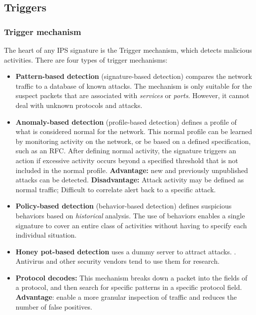 \subsection{Triggers}

\subsubsection{Trigger mechanism}

The heart of any IPS signature is the Trigger mechanism, which detects malicious activities. There are four types of trigger mechanisms:

\begin{itemize}
\item \textbf{Pattern-based detection} (signature-based detection) compares the network traffic to a database of known attacks. The mechanism is only suitable for the suspect packets that are associated with \emph{services} or \emph{ports}. However, it cannot deal with unknown protocols and attacks.

\item \textbf{Anomaly-based detection} (profile-based detection) defines a profile of what is considered normal for the network. This normal profile can be learned by monitoring activity on the network, or be based on a defined specification, such as an RFC. After defining normal activity, the signature triggers an action if excessive activity occurs beyond a specified threshold that is not included in the normal profile. \textbf{Advantage:} new and previously unpublished attacks can be detected. \textbf{Disadvantage:} Attack activity may be defined as normal traffic; Difficult to correlate alert back to a specific attack.

\item \textbf{Policy-based detection} (behavior-based detection) defines suspicious behaviors based on \emph{historical} analysis. The use of behaviors enables a single signature to cover an entire class of activities without having to specify each individual situation.

\item \textbf{Honey pot-based detection} uses a dummy server to attract attacks. . Antivirus and other security vendors tend to use them for research.

\item \textbf{Protocol decodes:} This mechanism breaks down a packet into the fields of a protocol, and then search for specific patterns in a specific protocol field. \textbf{Advantage}: enable a more granular inspection of traffic and reduces the number of false positives.
\end{itemize}

